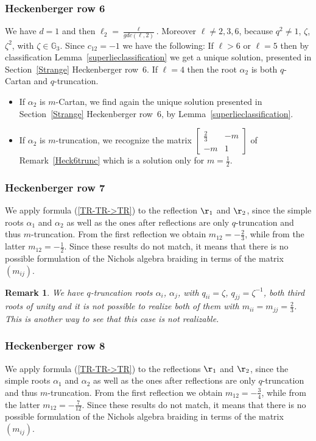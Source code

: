 \documentclass[10pt,a4paper]{amsart}
\numberwithin{equation}{section}
\newtheorem{oss}[teo]{Remark} }
\begin{document}
\subsubsection*{Heckenberger row 6}
We have $d=1$ and then $\ell_2 = \frac{\ell}{gdc(\ell,2)}$. Moreover $\ell \neq 2, 3, 6$, because $q^2 \neq 1$, $\zeta$, $\zeta^2$, with $\zeta \in \mathbb{G}_3$. Since $c_{12}=-1$ we have the following: If $\ell > 6$ or $\ell = 5$ then by classification Lemma~\ref{superlieclassification} we get a unique solution, presented in Section~\ref{Strange} Heckenberger row~6. If $\ell = 4$ then the root $\alpha_2$ is both $q$-Cartan and $q$-truncation.
\begin{itemize}\itemsep=0pt
	\item If $\alpha_2$ is $m$-Cartan, we find again the unique solution presented in Section~\ref{Strange} Heckenberger row~6, by Lemma~\ref{superlieclassification}.
	\item If $\alpha_2$ is $m$-truncation, we recognize the matrix $\left[\begin{smallmatrix}
 \frac{2}{3} & -m\\
 -m & 1
\end{smallmatrix}\right] $
of Remark~\ref{Heck6trunc} which is a solution only for $m=\frac{1}{2}$.
\end{itemize}

\subsubsection*{Heckenberger row 7}
We apply formula (\ref{TR-TR->TR}) to the reflection $\r_1$ and $\r_2$, since the simple roots $\alpha_1$ and $\alpha_2$ as well as the ones after reflections are only $q$-truncation and thus $m$-truncation. From the first reflection we obtain $m_{12}=-\frac{2}{3}$, while from the latter $m_{12}=-\frac{1}{2}$. Since these results do not match, it means that there is no possible formulation of the Nichols algebra braiding in terms of the matrix~$(m_{ij})$.
\begin{oss} We have $q$-truncation roots $\alpha_i$, $\alpha_j$, with $q_{ii}= \zeta$, $q_{jj}=\zeta^{-1}$, both third roots of unity and it is not possible to realize both of them with $m_{ii}=m_{jj}=\frac{2}{3}$. This is another way to see that this case is not realizable.
\end{oss}

\subsubsection*{Heckenberger row 8}
We apply formula (\ref{TR-TR->TR}) to the reflections $\r_1$ and $\r_2$, since the simple roots $\alpha_1$ and $\alpha_2$ as well as the ones after reflections are only $q$-truncation and thus $m$-truncation. From the first reflection we obtain $m_{12}=-\frac{3}{4}$, while from the latter $m_{12}=-\frac{7}{12}$. Since these results do not match, it means that there is no possible formulation of the Nichols algebra braiding in terms of the matrix~$(m_{ij})$.
\end{document}
